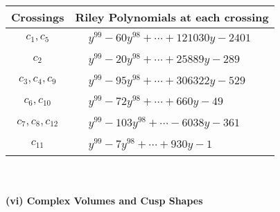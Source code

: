 \documentclass[1p]{elsarticle_modified}
\theoremstyle{definition}
\begin{document}
\begin{tabular}{m{50pt}|m{274pt}}
Crossings & \hspace{64pt}Riley Polynomials at each crossing \\
\hline $$\begin{aligned}c_{1},c_{5}\end{aligned}$$&$\begin{aligned}
&y^{99}-60 y^{98}+\cdots+121030 y-2401
\end{aligned}$\\
\hline $$\begin{aligned}c_{2}\end{aligned}$$&$\begin{aligned}
&y^{99}-20 y^{98}+\cdots+25889 y-289
\end{aligned}$\\
\hline $$\begin{aligned}c_{3},c_{4},c_{9}\end{aligned}$$&$\begin{aligned}
&y^{99}-95 y^{98}+\cdots+306322 y-529
\end{aligned}$\\
\hline $$\begin{aligned}c_{6},c_{10}\end{aligned}$$&$\begin{aligned}
&y^{99}-72 y^{98}+\cdots+660 y-49
\end{aligned}$\\
\hline $$\begin{aligned}c_{7},c_{8},c_{12}\end{aligned}$$&$\begin{aligned}
&y^{99}-103 y^{98}+\cdots-6038 y-361
\end{aligned}$\\
\hline $$\begin{aligned}c_{11}\end{aligned}$$&$\begin{aligned}
&y^{99}-7 y^{98}+\cdots+930 y-1
\end{aligned}$\\
\hline
\end{tabular}\\~\\
\newpage\flushleft \textbf{(vi) Complex Volumes and Cusp Shapes}
\end{document}
